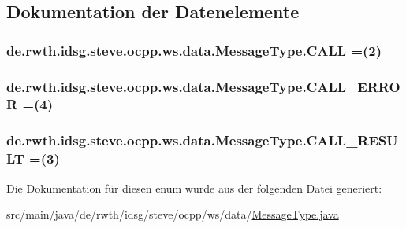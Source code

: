 \subsection{Dokumentation der Datenelemente}
\hypertarget{enumde_1_1rwth_1_1idsg_1_1steve_1_1ocpp_1_1ws_1_1data_1_1_message_type_a8c9631be897fe932418c583d7aecf89e}{
\subsubsection[{C\-A\-L\-L}]{\setlength{\rightskip}{0pt plus 5cm}de.\-rwth.\-idsg.\-steve.\-ocpp.\-ws.\-data.\-Message\-Type.\-C\-A\-L\-L =(2)}}\label{enumde_1_1rwth_1_1idsg_1_1steve_1_1ocpp_1_1ws_1_1data_1_1_message_type_a8c9631be897fe932418c583d7aecf89e}
\hypertarget{enumde_1_1rwth_1_1idsg_1_1steve_1_1ocpp_1_1ws_1_1data_1_1_message_type_a9e7086380926a62f0316b519da21ccea}{
\subsubsection[{C\-A\-L\-L\-\_\-\-E\-R\-R\-O\-R}]{\setlength{\rightskip}{0pt plus 5cm}de.\-rwth.\-idsg.\-steve.\-ocpp.\-ws.\-data.\-Message\-Type.\-C\-A\-L\-L\-\_\-\-E\-R\-R\-O\-R =(4)}}\label{enumde_1_1rwth_1_1idsg_1_1steve_1_1ocpp_1_1ws_1_1data_1_1_message_type_a9e7086380926a62f0316b519da21ccea}
\hypertarget{enumde_1_1rwth_1_1idsg_1_1steve_1_1ocpp_1_1ws_1_1data_1_1_message_type_a4bc539499fbd752d76ede7c8768c4f38}{
\subsubsection[{C\-A\-L\-L\-\_\-\-R\-E\-S\-U\-L\-T}]{\setlength{\rightskip}{0pt plus 5cm}de.\-rwth.\-idsg.\-steve.\-ocpp.\-ws.\-data.\-Message\-Type.\-C\-A\-L\-L\-\_\-\-R\-E\-S\-U\-L\-T =(3)}}\label{enumde_1_1rwth_1_1idsg_1_1steve_1_1ocpp_1_1ws_1_1data_1_1_message_type_a4bc539499fbd752d76ede7c8768c4f38}


Die Dokumentation für diesen enum wurde aus der folgenden Datei generiert\-:\begin{DoxyCompactItemize}
\item 
src/main/java/de/rwth/idsg/steve/ocpp/ws/data/\hyperlink{_message_type_8java}{Message\-Type.\-java}\end{DoxyCompactItemize}
